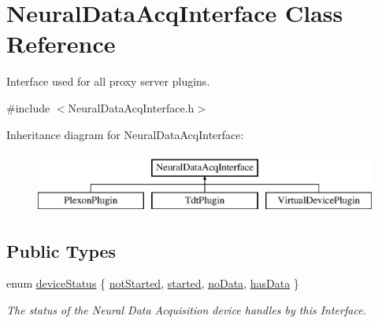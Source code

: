 \hypertarget{class_neural_data_acq_interface}{\section{Neural\-Data\-Acq\-Interface Class Reference}
\label{class_neural_data_acq_interface}
}


Interface used for all proxy server plugins.  




{\ttfamily \#include $<$Neural\-Data\-Acq\-Interface.\-h$>$}

Inheritance diagram for Neural\-Data\-Acq\-Interface\-:\begin{figure}[H]
\begin{center}
\leavevmode
\includegraphics[height=2.000000cm]{class_neural_data_acq_interface}
\end{center}
\end{figure}
\subsection*{Public Types}
\begin{DoxyCompactItemize}
\item 
enum \hyperlink{class_neural_data_acq_interface_a18d2ffb89521e40cba91a159e47fd449}{device\-Status} \{ \hyperlink{class_neural_data_acq_interface_a18d2ffb89521e40cba91a159e47fd449a179221e026143c59c99f8398ecc52bc6}{not\-Started}, 
\hyperlink{class_neural_data_acq_interface_a18d2ffb89521e40cba91a159e47fd449a62e57d351961602cba73fe13896e3e0b}{started}, 
\hyperlink{class_neural_data_acq_interface_a18d2ffb89521e40cba91a159e47fd449ab7cf1e66c69714385eb173c0fa0e5a7b}{no\-Data}, 
\hyperlink{class_neural_data_acq_interface_a18d2ffb89521e40cba91a159e47fd449a1991e24a6bc1467ad41dfacb32c580b8}{has\-Data}
 \}
\begin{DoxyCompactList}\small\item\em The status of the Neural Data Acquisition device handles by this Interface. \end{DoxyCompactList}\end{DoxyCompactItemize}

